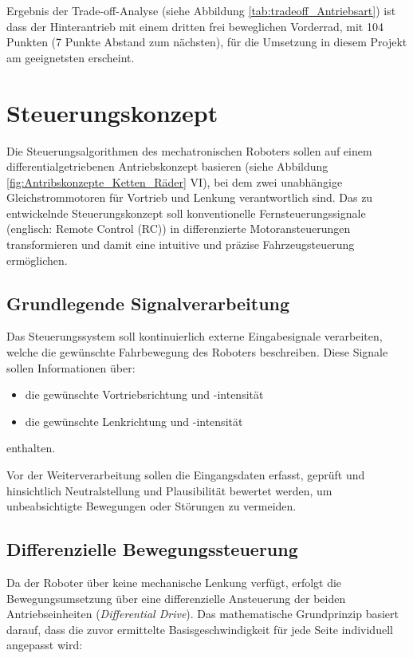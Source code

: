 Ergebnis der Trade-off-Analyse (siehe Abbildung \ref{tab:tradeoff_Antriebsart}) ist dass der Hinterantrieb mit einem dritten frei beweglichen Vorderrad, mit 104 Punkten (7 Punkte Abstand zum nächsten), für die Umsetzung in diesem Projekt am geeignetsten erscheint. 

\section{Steuerungskonzept}%
\label{cha:Steuerungskonzept}

\label{sec:Steuerungskonzept}
Die Steuerungsalgorithmen des mechatronischen Roboters sollen auf einem differentialgetriebenen Antriebskonzept basieren (siehe Abbildung \ref{fig:Antribskonzepte_Ketten_Räder} VI), bei dem zwei unabhängige Gleichstrommotoren für Vortrieb und Lenkung verantwortlich sind. Das zu entwickelnde Steuerungskonzept soll konventionelle Fernsteuerungssignale (englisch: Remote Control (RC)) in differenzierte Motoransteuerungen transformieren und damit eine intuitive und präzise Fahrzeugsteuerung ermöglichen.

\subsection{Grundlegende Signalverarbeitung}%
\label{cha:Grundlegende Signalverarbeitung}

Das Steuerungssystem soll kontinuierlich externe Eingabesignale verarbeiten, welche die gewünschte Fahrbewegung des Roboters beschreiben. Diese Signale sollen Informationen über:
\begin{itemize}
	\item die gewünschte Vortriebsrichtung und -intensität
	\item die gewünschte Lenkrichtung und -intensität
\end{itemize}
enthalten.

Vor der Weiterverarbeitung sollen die Eingangsdaten erfasst, geprüft und hinsichtlich Neutralstellung und Plausibilität bewertet werden, um unbeabsichtigte Bewegungen oder Störungen zu vermeiden.

\subsection{Differenzielle Bewegungssteuerung}%
\label{cha:Differenzielle Bewegungssteuerung}

Da der Roboter über keine mechanische Lenkung verfügt, erfolgt die Bewegungsumsetzung über eine differenzielle Ansteuerung der beiden Antriebseinheiten (\textit{Differential Drive}). Das mathematische Grundprinzip basiert darauf, dass die zuvor ermittelte Basisgeschwindigkeit für jede Seite individuell angepasst wird:

